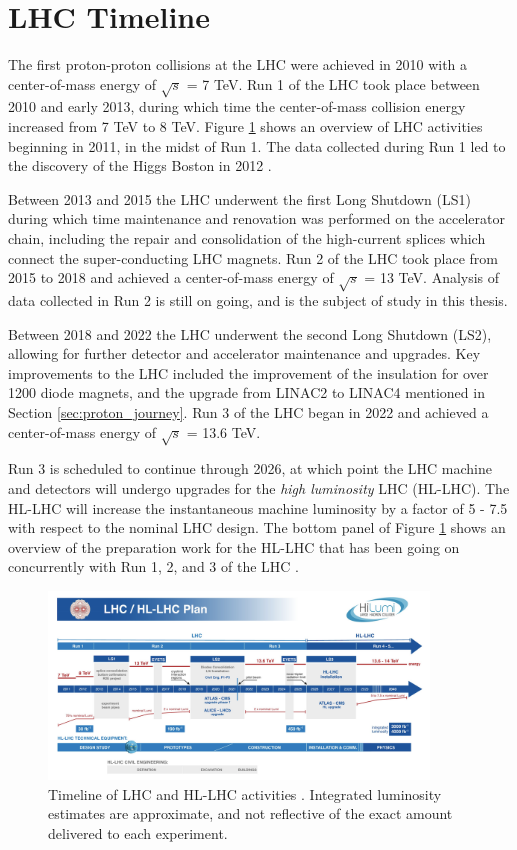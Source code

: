 \section{LHC Timeline}
The first proton-proton collisions at the LHC were achieved in 2010 with a center-of-mass energy of $\sqrt{s}$ = 7 TeV. Run 1 of the LHC took place between 2010 and early 2013, during which time the center-of-mass collision energy increased from 7 TeV to 8 TeV. Figure \ref{fig:lhc_timeline} shows an overview of LHC activities beginning in 2011, in the midst of Run 1. The data collected during Run 1 led to the discovery of the Higgs Boston in 2012 \cite{higgs_paper}. \par

Between 2013 and 2015 the LHC underwent the first Long Shutdown (LS1) during which time maintenance and renovation was performed on the accelerator chain, including the repair and consolidation of the high-current splices which connect the super-conducting LHC magnets. Run 2 of the LHC took place from 2015 to 2018 and achieved a center-of-mass energy of $\sqrt{s}$ = 13 TeV. Analysis of data collected in Run 2 is still on going, and is the subject of study in this thesis. \par

Between 2018 and 2022 the LHC underwent the second Long Shutdown (LS2), allowing for further detector and accelerator maintenance and upgrades. Key improvements to the LHC included the improvement of the insulation for over 1200 diode magnets, and the upgrade from LINAC2 to LINAC4 mentioned in Section \ref{sec:proton_journey}. Run 3 of the LHC began in 2022 and achieved a center-of-mass energy of $\sqrt{s}$ = 13.6 TeV. \par

Run 3 is scheduled to continue through 2026, at which point the LHC machine and detectors will undergo upgrades for the \textit{high luminosity} LHC (HL-LHC). The HL-LHC will increase the instantaneous machine luminosity by a factor of 5 - 7.5 with respect to the nominal LHC design. The bottom panel of Figure \ref{fig:lhc_timeline} shows an overview of the preparation work for the HL-LHC that has been going on concurrently with Run 1, 2, and 3 of the LHC \cite{hl_lhc}. 

\begin{figure}
        \centering
	\includegraphics[width=0.9\textwidth]{figures/ch2/hl_lhc_timeline.png}
	\caption{Timeline of LHC and HL-LHC activities \cite{lhc_timeline}. Integrated luminosity estimates are approximate, and not reflective of the exact amount delivered to each experiment.}
	\label{fig:lhc_timeline}
\end{figure}
